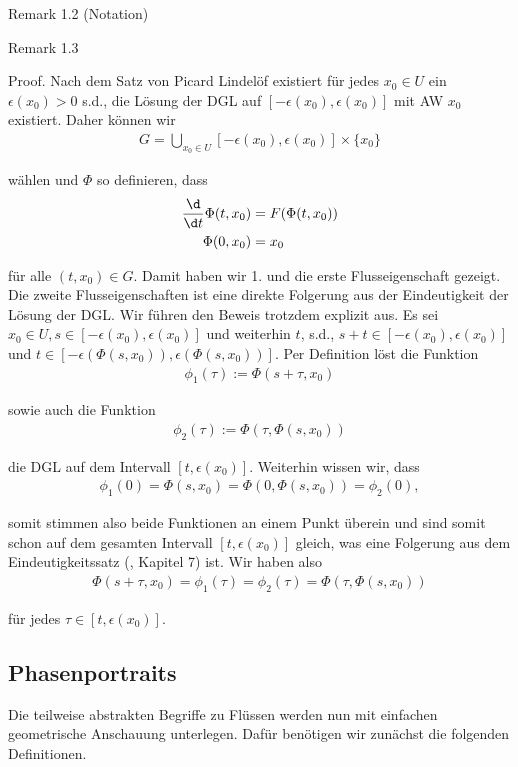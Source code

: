 \documentclass[letterpaper,10pt,english]{jupyterBook}
\begin{document}
\begin{emphBox}{}{}{Remark 1.2 (Notation)}
\begin{emphBox}{}{}{Remark 1.3}
\begin{emphBox}{}{}
\par
Proof. Nach dem Satz von Picard Lindelöf existiert für jedes \(x_0\in U\) ein \(\epsilon(x_0)>0\) s.d., die Lösung der DGL
auf \([-\epsilon(x_0),\epsilon(x_0)]\) mit AW \(x_0\) existiert. Daher können wir
\begin{align*}
G = \bigcup_{x_0\in U} [-\epsilon(x_0),\epsilon(x_0)] \times\{x_0\}
\end{align*}
\par
wählen und \(\Phi\) so definieren, dass
\begin{align*}
\frac{\d}{\d t} \Phi(t, x_0) &= F(\Phi(t, x_0))\\
\Phi(0, x_0) &= x_0
\end{align*}
\par
für alle \((t, x_0)\in G\). Damit haben wir 1. und die erste Flusseigenschaft gezeigt. Die zweite Flusseigenschaften ist eine direkte Folgerung aus der Eindeutigkeit der Lösung der DGL. Wir führen den Beweis trotzdem explizit aus. Es sei \(x_0\in U, s\in [-\epsilon(x_0), \epsilon(x_0)]\) und weiterhin \(t\), s.d., \(s+t \in [-\epsilon(x_0), \epsilon(x_0)]\) und \(t\in [-\epsilon(\Phi(s,x_0)), \epsilon(\Phi(s,x_0))]\).
Per Definition löst die Funktion
\begin{align*}
\phi_1(\tau) := \Phi(s + \tau, x_0)
\end{align*}
\par
sowie auch die Funktion
\begin{align*}
\phi_2(\tau) := \Phi(\tau, \Phi(s,x_0))
\end{align*}
\par
die DGL auf dem Intervall \([t, \epsilon(x_0)]\). Weiterhin wissen wir, dass
\begin{align*}
\phi_1(0) = \Phi(s, x_0) = \Phi(0, \Phi(s, x_0)) = \phi_2(0),
\end{align*}
\par
somit stimmen also beide Funktionen an einem Punkt überein und sind somit schon auf dem gesamten Intervall \([t, \epsilon(x_0)]\) gleich, was
eine Folgerung aus dem Eindeutigkeitssatz (\cite{Ten21}, Kapitel 7) ist. Wir haben also
\begin{align*}
\Phi(s + \tau, x_0) = \phi_1(\tau) = \phi_2(\tau) = \Phi(\tau, \Phi(s,x_0))
\end{align*}
\par
für jedes \(\tau\in [t, \epsilon(x_0)]\).
\end{emphBox}


\subsection{Phasenportraits}
\label{\detokenize{ode/fluesse:phasenportraits}}
\par
Die teilweise abstrakten Begriffe zu Flüssen werden nun mit einfachen geometrische Anschauung unterlegen. Dafür benötigen wir zunächst die folgenden Definitionen.
\label{ode/fluesse:definition-5}
\begin{definition}{}{}




\end{definition}
\end{emphBox}
\end{emphBox}
\end{document}
